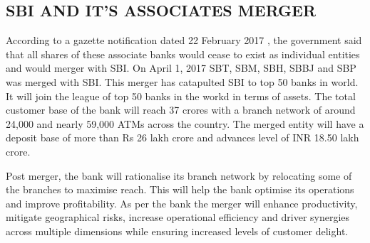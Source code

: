\documentclass[a4paper, 12pt]{extarticle}
\begin{document}
{\subsection {SBI AND IT'S ASSOCIATES MERGER}
\par According to a gazette notification dated 22 February 2017 , the government said that all shares of these associate banks would cease to exist as individual entities and would merger with SBI. On April 1, 2017 SBT, SBM, SBH, SBBJ and SBP was merged with SBI. This merger has catapulted SBI to top 50 banks in world. It will join the league of top 50 banks in the workd in terms of assets. The total customer base of the bank will reach 37 crores with a branch network of around 24,000 and nearly 59,000 ATMs across the country. The merged entity will have a deposit base of more than Rs 26 lakh crore and advances level of INR 18.50 lakh crore.
\par Post merger, the bank will rationalise its branch network by relocating some of the branches to maximise reach. This will help the bank optimise its operations and improve profitability. As per the bank the merger will enhance productivity, mitigate geographical risks, increase operational efficiency and driver synergies across multiple dimensions while ensuring increased levels of customer delight.

}
\end{document}
